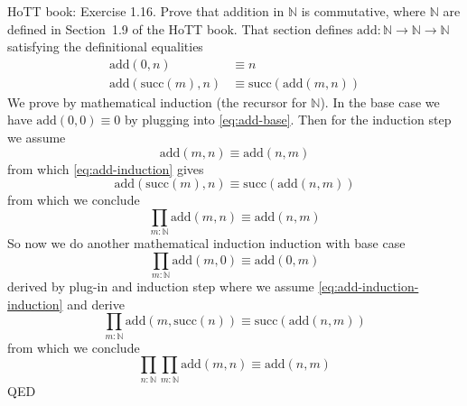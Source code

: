 \documentclass[11pt]{article}
\newcommand{\nats}{\mathbb{N}}
\begin{document}
\medskip\noindent
HoTT book: Exercise 1.16.  Prove that addition in $\nats$ is commutative,
where $\nats$ are defined in Section~1.9 of the HoTT book.  That section
defines $\text{add} : \nats \to \nats \to \nats$ satisfying the definitional
equalities
\begin{subequations}
\begin{align}
   \text{add}(0, n) & \equiv n
   \label{eq:add-base}
   \\
   \text{add}(\text{succ}(m), n) & \equiv \text{succ}(\text{add}(m, n))
   \label{eq:add-induction}
\end{align}
\end{subequations}
We prove by mathematical induction (the recursor for $\nats$).  In the
base case we have $\text{add}(0, 0) \equiv 0$ by plugging
into \eqref{eq:add-base}.  Then for the induction step we assume
\begin{equation} \label{eq:commutivity-induction}
   \text{add}(m, n) \equiv \text{add}(n, m)
\end{equation}
from which \eqref{eq:add-induction} gives
$$
   \text{add}(\text{succ}(m), n) \equiv \text{succ}(\text{add}(n, m))
$$
from which we conclude
\begin{equation} \label{eq:add-induction-induction}
   \prod_{m : \nats} \text{add}(m, n) \equiv \text{add}(n, m)
\end{equation}
So now we do another mathematical induction induction with base case
$$
   \prod_{m : \nats} \text{add}(m, 0) \equiv \text{add}(0, m)
$$
derived by plug-in and induction step where we assume
\eqref{eq:add-induction-induction} and derive
$$
   \prod_{m : \nats} \text{add}(m, \text{succ}(n)) \equiv
   \text{succ}(\text{add}(n, m))
$$
from which we conclude
$$
   \prod_{n : \nats}
   \prod_{m : \nats} \text{add}(m, n) \equiv \text{add}(n, m)
$$
QED
\end{document}
